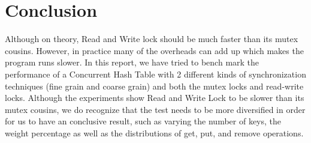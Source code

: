 \documentclass[11pt]{article}
\begin{document}
\section{Conclusion}
Although on theory, Read and Write lock should be much faster than its mutex cousins. However, in practice many of the overheads can add up which makes the program runs slower. In this report, we have tried to bench mark the performance of a Concurrent Hash Table with 2 different kinds of synchronization techniques (fine grain and coarse grain) and both the mutex locks and read-write locks. Although the experiments show Read and Write Lock to be slower than its mutex cousins, we do recognize that the test needs to be more diversified in order for us to have an conclusive result, such as varying the number of keys, the weight percentage as well as the distributions of get, put, and remove operations.
\end{document}
